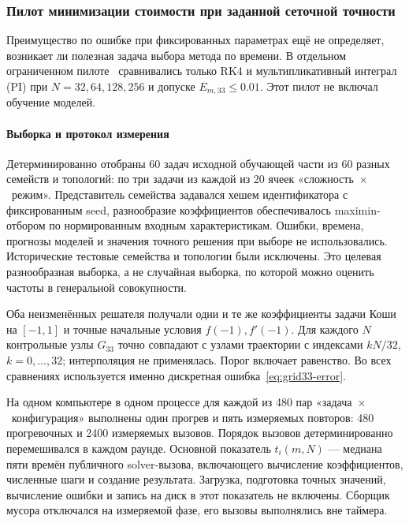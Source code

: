 \subsubsection{Пилот минимизации стоимости при заданной сеточной точности}
\label{sec:costpilot}

Преимущество по ошибке при фиксированных параметрах ещё не определяет,
возникает ли полезная задача выбора метода по времени. В отдельном
ограниченном пилоте~\cite{savedcost60} сравнивались только RK4 и
мультипликативный интеграл (PI) при $N=32,64,128,256$ и допуске
$E_{m,33}\le0.01$. Этот пилот не включал обучение моделей.

\paragraph{Выборка и протокол измерения\\}
Детерминированно отобраны 60 задач исходной обучающей части из 60 разных
семейств и топологий: по три задачи из каждой из 20 ячеек
«сложность~$\times$~режим». Представитель семейства задавался хешем
идентификатора с фиксированным seed, разнообразие коэффициентов
обеспечивалось maximin-отбором по нормированным входным характеристикам.
Ошибки, времена, прогнозы моделей и значения точного решения при выборе
не использовались. Исторические тестовые семейства и топологии были
исключены. Это целевая разнообразная выборка, а не случайная выборка,
по которой можно оценить частоты в генеральной совокупности.

Оба неизменённых решателя получали одни и те же коэффициенты задачи Коши
на $[-1,1]$ и точные начальные условия $f(-1),f'(-1)$.
Для каждого $N$ контрольные узлы $G_{33}$ точно совпадают с узлами
траектории с индексами $kN/32$, $k=0,\ldots,32$; интерполяция не
применялась. Порог включает равенство. Во всех сравнениях используется
именно дискретная ошибка~\eqref{eq:grid33-error}.

На одном компьютере в одном процессе для каждой из 480 пар
«задача~$\times$~конфигурация» выполнены один прогрев и пять измеряемых
повторов: 480 прогревочных и 2400 измеряемых вызовов. Порядок вызовов
детерминированно перемешивался в каждом раунде. Основной показатель
$t_i(m,N)$ --- медиана пяти времён публичного solver-вызова, включающего
вычисление коэффициентов, численные шаги и создание результата.
Загрузка, подготовка точных значений, вычисление ошибки и запись на диск
в этот показатель не включены. Сборщик мусора отключался на измеряемой
фазе, его вызовы выполнялись вне таймера.

